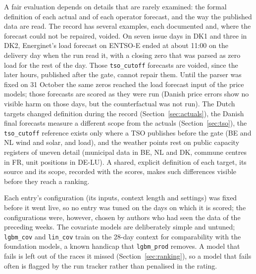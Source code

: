 \documentclass[11pt,a4paper]{article}
\newcommand{\m}[1]{\texttt{#1}}
\begin{document}
A fair evaluation depends on details that are rarely examined: the formal definition of each actual and of each
operator forecast, and the way the published data are read. The record has several examples, each documented and,
where the forecast could not be repaired, voided. On seven issue days in DK1 and three in DK2, Energinet's load
forecast on ENTSO-E ended at about 11:00 on the delivery day when the run read it, with a closing zero that was parsed
as zero load for the rest of the day. Those \m{tso\_cutoff} forecasts are voided, since the later hours, published
after the gate, cannot repair them. Until the parser was fixed on 31 October the same zeros reached the load forecast
input of the price models; those forecasts are scored as they were run (Danish price errors show no visible harm on
those days, but the counterfactual was not run). The Dutch targets changed definition during the record
(Section~\ref{sec:actuals}), the Danish final forecasts measure a different scope from the actuals
(Section~\ref{sec:tso}), the \m{tso\_cutoff} reference exists only where a TSO publishes before the gate (BE and NL
wind and solar, and load), and the weather points rest on public capacity registers of uneven detail (municipal data
in BE, NL and DK, commune centres in FR, unit positions in DE-LU). A shared, explicit definition of each target, its
source and its scope, recorded with the scores, makes such differences visible before they reach a ranking.

Each entry's configuration (its inputs, context length and settings) was fixed before it went live, so no entry was
tuned on the days on which it is scored; the configurations were, however, chosen by authors who had seen the data of
the preceding weeks. The covariate models are deliberately simple and untuned; \m{lgbm\_cov} and \m{lin\_cov} train
on the 28-day context for comparability with the foundation models, a known handicap that \m{lgbm\_prod} removes. A
model that fails is left out of the races it missed (Section~\ref{sec:ranking}), so a model that fails often is
flagged by the run tracker rather than penalised in the rating.
\end{document}
